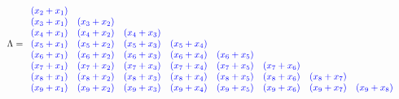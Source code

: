 \documentclass[11]{article}
\begin{document}
\[
\begin{aligned}
\Lambda =\ &
\begin{array}{lllllllll}
          &           &           &           &           &           &           &           &           \\
\textcolor{blue}{(x_2+x_1)} &           &           &           &           &           &           &           &           \\
\textcolor{blue}{(x_3+x_1)} & \textcolor{blue}{(x_3+x_2)} &           &           &           &           &           &           &           \\
\textcolor{blue}{(x_4+x_1)} & \textcolor{blue}{(x_4+x_2)} & \textcolor{blue}{(x_4+x_3)} &           &           &           &           &           &           \\
\textcolor{blue}{(x_5+x_1)} & \textcolor{blue}{(x_5+x_2)} & \textcolor{blue}{(x_5+x_3)} & \textcolor{blue}{(x_5+x_4)} &           &           &           &           &           \\
\textcolor{blue}{(x_6+x_1)} & \textcolor{blue}{(x_6+x_2)} & \textcolor{blue}{(x_6+x_3)} & \textcolor{blue}{(x_6+x_4)} & \textcolor{blue}{(x_6+x_5)} &           &           &           &           \\
\textcolor{blue}{(x_7+x_1)} & \textcolor{blue}{(x_7+x_2)} & \textcolor{blue}{(x_7+x_3)} & \textcolor{blue}{(x_7+x_4)} & \textcolor{blue}{(x_7+x_5)} & \textcolor{blue}{(x_7+x_6)} &           &           &           \\
\textcolor{blue}{(x_8+x_1)} & \textcolor{blue}{(x_8+x_2)} & \textcolor{blue}{(x_8+x_3)} & \textcolor{blue}{(x_8+x_4)} & \textcolor{blue}{(x_8+x_5)} & \textcolor{blue}{(x_8+x_6)} & \textcolor{blue}{(x_8+x_7)} &           &           \\
\textcolor{blue}{(x_9+x_1)} & \textcolor{blue}{(x_9+x_2)} & \textcolor{blue}{(x_9+x_3)} & \textcolor{blue}{(x_9+x_4)} & \textcolor{blue}{(x_9+x_5)} & \textcolor{blue}{(x_9+x_6)} & \textcolor{blue}{(x_9+x_7)} & \textcolor{blue}{(x_9+x_8)} &
\end{array}
\end{aligned}
\]
\end{document}
